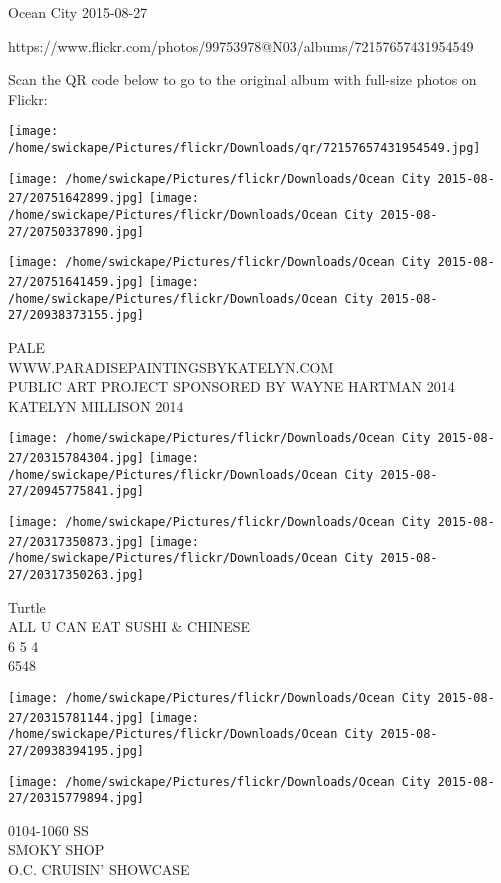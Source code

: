 \documentclass[10pt,letterpaper]{article}
\begin{document}
Ocean City 2015-08-27

https://www.flickr.com/photos/99753978@N03/albums/72157657431954549

Scan the QR code below to go to the original album with full-size photos on Flickr:

\texttt{[image: /home/swickape/Pictures/flickr/Downloads/qr/72157657431954549.jpg]}
\pagebreak

\texttt{[image: /home/swickape/Pictures/flickr/Downloads/Ocean City 2015-08-27/20751642899.jpg]}
\texttt{[image: /home/swickape/Pictures/flickr/Downloads/Ocean City 2015-08-27/20750337890.jpg]}

\texttt{[image: /home/swickape/Pictures/flickr/Downloads/Ocean City 2015-08-27/20751641459.jpg]}
\texttt{[image: /home/swickape/Pictures/flickr/Downloads/Ocean City 2015-08-27/20938373155.jpg]}

PALE\\
WWW.PARADISEPAINTINGSBYKATELYN.COM\\
PUBLIC ART PROJECT SPONSORED BY WAYNE HARTMAN 2014\\
KATELYN MILLISON 2014\\
\pagebreak

\texttt{[image: /home/swickape/Pictures/flickr/Downloads/Ocean City 2015-08-27/20315784304.jpg]}
\texttt{[image: /home/swickape/Pictures/flickr/Downloads/Ocean City 2015-08-27/20945775841.jpg]}

\texttt{[image: /home/swickape/Pictures/flickr/Downloads/Ocean City 2015-08-27/20317350873.jpg]}
\texttt{[image: /home/swickape/Pictures/flickr/Downloads/Ocean City 2015-08-27/20317350263.jpg]}

Turtle\\
ALL U CAN EAT SUSHI \& CHINESE\\
6 5 4\\
6548\\
\pagebreak

\texttt{[image: /home/swickape/Pictures/flickr/Downloads/Ocean City 2015-08-27/20315781144.jpg]}
\texttt{[image: /home/swickape/Pictures/flickr/Downloads/Ocean City 2015-08-27/20938394195.jpg]}

\vspace{0.25in}
\texttt{[image: /home/swickape/Pictures/flickr/Downloads/Ocean City 2015-08-27/20315779894.jpg]}

0104{-}1060 SS\\
SMOKY SHOP\\
O.C. CRUISIN' SHOWCASE\\
\pagebreak
\end{document}
